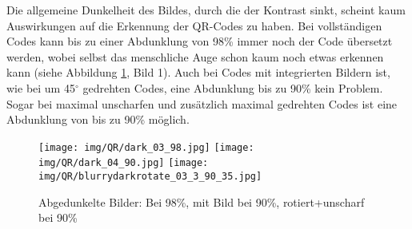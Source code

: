 Die allgemeine Dunkelheit des Bildes, durch die der Kontrast sinkt, scheint kaum Auswirkungen auf die Erkennung der QR-Codes zu haben. Bei vollständigen Codes kann bis zu einer Abdunklung von 98\% immer noch der Code übersetzt werden, wobei selbst das menschliche Auge schon kaum noch etwas erkennen kann (siehe Abbildung \ref*{fig:qrdark}, Bild 1). Auch bei Codes mit integrierten Bildern ist, wie bei um 45$ ^\circ $ gedrehten Codes, eine Abdunklung bis zu 90\% kein Problem. Sogar bei maximal unscharfen und zusätzlich maximal gedrehten Codes ist eine Abdunklung von bis zu 90\% möglich.
\begin{figure}[H]
  \centering
  \texttt{[image: img/QR/dark\_03\_98.jpg]}
  \texttt{[image: img/QR/dark\_04\_90.jpg]}
  \texttt{[image: img/QR/blurrydarkrotate\_03\_3\_90\_35.jpg]}
  \caption{Abgedunkelte Bilder: Bei 98\%, mit Bild bei 90\%, rotiert+unscharf bei 90\%}
  \label{fig:qrdark}
\end{figure}

